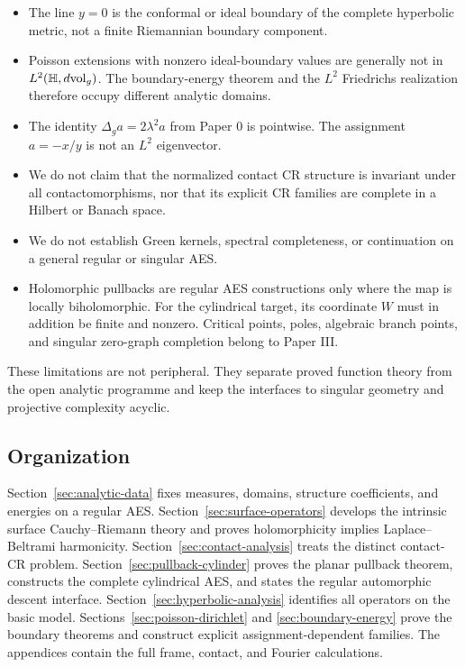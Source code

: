 \begin{itemize}
\item The line $y=0$ is the conformal or ideal boundary of the complete hyperbolic
metric, not a finite Riemannian boundary component.
\item Poisson extensions with nonzero ideal-boundary values are generally not in
$L^2(\mathbb{H},d\mathrm{vol}_g)$.  The boundary-energy theorem and the $L^2$ Friedrichs
realization therefore occupy different analytic domains.
\item The identity $\Delta_ga=2\lambda^2a$ from Paper 0 is pointwise.  The assignment
$a=-x/y$ is not an $L^2$ eigenvector.
\item We do not claim that the normalized contact CR structure is invariant under all
contactomorphisms, nor that its explicit CR families are complete in a Hilbert or
Banach space.
\item We do not establish Green kernels, spectral completeness, or continuation on a
general regular or singular AES.
\item Holomorphic pullbacks are regular AES constructions only where the map is
locally biholomorphic.  For the cylindrical target, its coordinate $W$ must in
addition be finite and nonzero.  Critical points, poles, algebraic branch points,
and singular zero-graph completion belong to Paper III.
\end{itemize}

These limitations are not peripheral.  They separate proved function theory from
the open analytic programme and keep the interfaces to singular geometry and
projective complexity acyclic.

\subsection{Organization}

Section~\ref{sec:analytic-data} fixes measures, domains, structure coefficients, and
energies on a regular AES.  Section~\ref{sec:surface-operators} develops the
intrinsic surface Cauchy--Riemann theory and proves holomorphicity implies
Laplace--Beltrami harmonicity.  Section~\ref{sec:contact-analysis} treats the
distinct contact-CR problem.  Section~\ref{sec:pullback-cylinder} proves the planar
pullback theorem, constructs the complete cylindrical AES, and states the regular
automorphic descent interface.  Section~\ref{sec:hyperbolic-analysis} identifies
all operators on the basic model.  Sections~\ref{sec:poisson-dirichlet} and
\ref{sec:boundary-energy} prove the boundary theorems and construct explicit
assignment-dependent families.  The appendices contain the full frame, contact, and
Fourier calculations.
